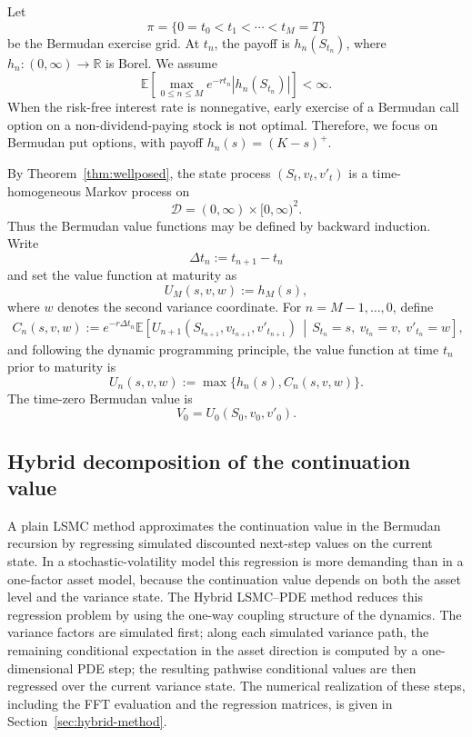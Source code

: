 \documentclass[pdflatex,sn-mathphys-num]{sn-jnl}
\theoremstyle{thmstyleone}%
\theoremstyle{thmstylethree}%
\theoremstyle{thmstyletwo}%
\newcommand{\E}{\mathbb E}
\newcommand{\R}{\mathbb R}
\begin{document}
Let
$$
\pi=\{0=t_0<t_1<\cdots<t_M=T\}
$$
be the Bermudan exercise grid. At $t_n$, the payoff is $h_n(S_{t_n})$, where
$h_n:(0,\infty)\to\R$ is Borel. We assume
$$
\E\!\left[
\max_{0\le n\le M}e^{-rt_n}|h_n(S_{t_n})|
\right]<\infty .
$$
When the risk-free interest rate is nonnegative, early exercise of a Bermudan call option on a non-dividend-paying stock is not optimal. Therefore, we focus on Bermudan put options, with payoff $h_n(s)=(K-s)^+$.

By Theorem~\ref{thm:wellposed}, the state process
$(S_t,v_t,v'_t)$ is a time-homogeneous Markov process on
$$
\mathcal D=(0,\infty)\times[0,\infty)^2 .
$$
Thus the Bermudan value functions may be defined by backward induction. Write
$$
\Delta t_n:=t_{n+1}-t_n
$$
and set the value function at maturity as
$$
U_M(s,v,w):=h_M(s),
$$
where $w$ denotes the second variance coordinate. For $n=M-1,\ldots,0$, define
$$
\begin{aligned}
C_n(s,v,w)
:=
e^{-r\Delta t_n}
\E\!\left[
U_{n+1}(S_{t_{n+1}},v_{t_{n+1}},v'_{t_{n+1}})
\,\middle|\,
S_{t_n}=s,\ v_{t_n}=v,\ v'_{t_n}=w
\right],
\end{aligned}
$$
and following the dynamic programming principle, the value function at time $t_n$ prior to maturity is
$$
U_n(s,v,w):=\max\{h_n(s),C_n(s,v,w)\}.
$$
The time-zero Bermudan value is
$$
V_0=U_0(S_0,v_0,v'_0).
$$

\subsection{Hybrid decomposition of the continuation value}\label{sec:hybrid-overview}

A plain LSMC method approximates the continuation value in the Bermudan recursion
by regressing simulated discounted next-step values on the current state. In a
stochastic-volatility model this regression is more demanding than in a one-factor
asset model, because the continuation value depends on both the asset level and the
variance state. The Hybrid LSMC--PDE method reduces this regression problem by
using the one-way coupling structure of the dynamics. The variance factors are simulated
first; along each simulated variance path, the remaining conditional expectation in
the asset direction is computed by a one-dimensional PDE step; the resulting
pathwise conditional values are then regressed over the current variance state. The
numerical realization of these steps, including the FFT evaluation and the regression
matrices, is given in Section~\ref{sec:hybrid-method}.
\end{document}
